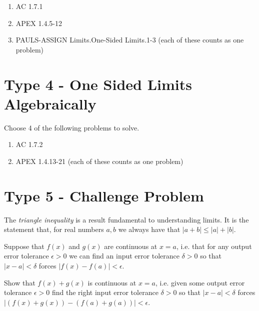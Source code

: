 \documentclass[12pt]{article}
\begin{document}
\begin{enumerate}
  \item AC 1.7.1
  \item APEX 1.4.5-12
  \item PAULS-ASSIGN Limits.One-Sided Limits.1-3 (each of these counts as one problem)
\end{enumerate}

\section{Type 4 - One Sided Limits Algebraically}
Choose 4 of the following problems to solve.

\begin{enumerate}
  \item AC 1.7.2
  \item APEX 1.4.13-21 (each of these counts as one problem)
\end{enumerate}

\section{Type 5 - Challenge Problem}

The \textit{triangle inequality} is a result fundamental to understanding limits. 
It is the statement that, for real numbers $a, b$ we always have that $| a + b | \leq |a| + |b|$.

  Suppose that $f(x)$ and $g(x)$ are continuous at $x = a$, i.e. that for any output error tolerance $\epsilon > 0$
    we can find an input error tolerance $\delta > 0$ so that $|x - a| < \delta$ forces $|f(x) - f(a)| < \epsilon$.

    Show that $f(x) + g(x)$ is continuous at $x = a$, i.e. given some output error tolerance $\epsilon > 0$
    find the right input error tolerance $\delta > 0$ so that $| x - a| < \delta$ forces $|(f(x) + g(x)) - (f(a) + g(a))| < \epsilon$.


\end{document}
